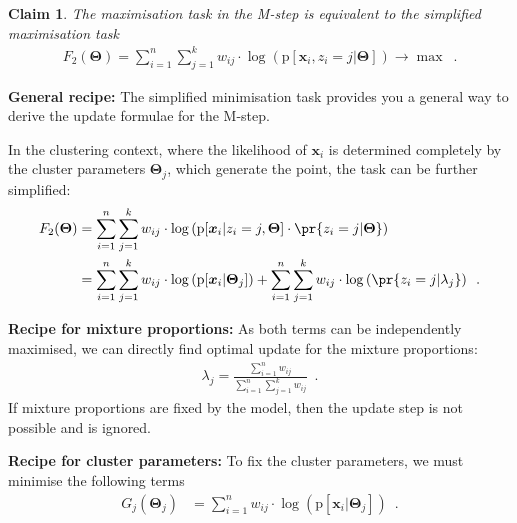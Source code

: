 \documentclass{article}
\newtheorem{claim}{Claim}
\renewcommand{\vec}[1]{\boldsymbol{#1}}
\newcommand{\pd}[1]{\mathrm{p}[#1]}
\begin{document}
\begin{claim}
The maximisation task in the M-step is equivalent to the simplified maximisation task
\begin{align*}
F_2(\vec{\Theta})
=\sum_{i=1}^n \sum_{j=1}^k w_{ij}\cdot \log \left(\pd{\vec{x}_i,z_i=j|\vec{\Theta}}\right)\to\max
\enspace.
\end{align*}
\end{claim} 

\noindent\textbf{General recipe:} The simplified minimisation task provides you a general way to derive the update formulae for the M-step.  \vspace*{3ex}

In the clustering context, where the likelihood of $\vec{x}_i$ is determined completely by the cluster parameters $\vec{\Theta}_j$, which generate the point, the task can be further simplified:
\begin{align*}
F_2(\vec{\Theta})
&=\sum_{i=1}^n \sum_{j=1}^k w_{ij}\cdot \log \left(\pd{\vec{x}_i|z_i=j,\vec{\Theta}}\cdot \pr{z_i=j|\vec{\Theta}}\right)\\
&=\sum_{i=1}^n \sum_{j=1}^k w_{ij}\cdot \log \left(\pd{\vec{x}_i|\vec{\Theta}_j}\right)
+\sum_{i=1}^n \sum_{j=1}^k w_{ij}\cdot \log \left(\pr{z_i=j|\lambda_j}\right)
\enspace.
\end{align*}

\noindent\textbf{Recipe for mixture proportions:}
As both terms can be independently maximised, we can directly find optimal update for the mixture proportions:
\begin{align*}
\lambda_j=\frac{\sum_{i=1}^n w_{ij}}{\sum_{i=1}^n\sum_{j=1}^k w_{ij}}\enspace.
\end{align*}    
If mixture proportions are fixed by the model, then the update step is not possible and is ignored. \vspace*{3ex}  

\noindent\textbf{Recipe for cluster parameters:}
To fix the cluster parameters, we must minimise the following terms
\begin{align*}
G_j(\vec{\Theta}_j)
&=\sum_{i=1}^n  w_{ij}\cdot \log \left(\pd{\vec{x}_i|\vec{\Theta}_j}\right)\enspace.
\end{align*}\vspace*{3ex}
\end{document}
